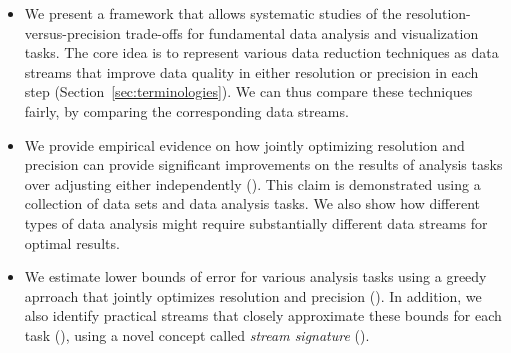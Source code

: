 \begin{itemize}
\item We present a framework that allows systematic studies of the resolution-versus-precision
  trade-offs for fundamental data analysis and visualization tasks. The core idea is to represent
  various data reduction techniques as data streams that improve data quality in either resolution
  or precision in each step (Section~\ref{sec:terminologies}). We can thus compare these techniques
  fairly, by comparing the corresponding data streams.
   
\item We provide empirical evidence on how jointly optimizing resolution and precision can provide
  significant improvements on the results of analysis tasks over adjusting either independently
  (). This claim is demonstrated using a collection of data sets and
  data analysis tasks. We also show how different types of data analysis might require substantially
  different data streams for optimal results.

\item We estimate lower bounds of error for various analysis tasks using a greedy aprroach that
  jointly optimizes resolution and precision (). In addition, we
  also identify practical streams that closely approximate these bounds for each task
  (),
  using a novel concept called \emph{stream signature}
  ().
\end{itemize}

